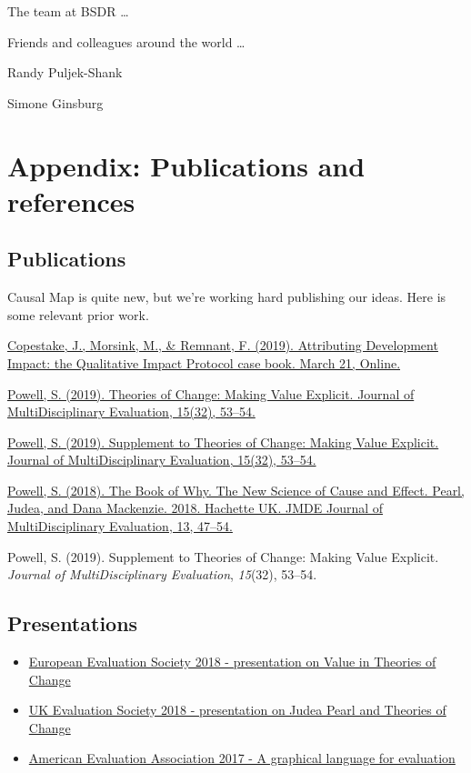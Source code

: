 \documentclass[
]{book}
\providecommand{\tightlist}{%
  \setlength{\itemsep}{0pt}\setlength{\parskip}{0pt}}
\begin{document}
The team at BSDR \ldots{}

Friends and colleagues around the world \ldots{}

Randy Puljek-Shank

Simone Ginsburg

\hypertarget{appendix-publications-and-references}{%
\chapter{Appendix: Publications and references}\label{appendix-publications-and-references}}

\hypertarget{publications}{%
\section{Publications}\label{publications}}

Causal Map is quite new, but we're working hard publishing our ideas. Here is some relevant prior work.

\href{https://practicalactionpublishing.com/book/105/attributing-development-impact}{Copestake, J., Morsink, M., \& Remnant, F. (2019). Attributing Development Impact: the Qualitative Impact Protocol case book. March 21, Online.}

\href{https://journals.sfu.ca/jmde/index.php/jmde_1/article/view/563}{Powell, S. (2019). Theories of Change: Making Value Explicit. Journal of MultiDisciplinary Evaluation, 15(32), 53--54.}

\href{https://journals.sfu.ca/jmde/index.php/jmde_1/article/view/561}{Powell, S. (2019). Supplement to Theories of Change: Making Value Explicit. Journal of MultiDisciplinary Evaluation, 15(32), 53--54.}

\href{https://journals.sfu.ca/jmde/index.php/jmde_1/article/view/507}{Powell, S. (2018). The Book of Why. The New Science of Cause and Effect. Pearl, Judea, and Dana Mackenzie. 2018. Hachette UK. JMDE Journal of MultiDisciplinary Evaluation, 13, 47--54.}

Powell, S. (2019). Supplement to Theories of Change: Making Value Explicit. \emph{Journal of MultiDisciplinary Evaluation}, \emph{15}(32), 53--54.

\hypertarget{presentations}{%
\section{Presentations}\label{presentations}}

\begin{itemize}
\tightlist
\item
  \href{https://drive.google.com/file/d/1FdiOs85iZCqZU6MdU3Lb5kgDOxq36G3b/view?usp=sharing}{European Evaluation Society 2018 - presentation on Value in Theories of Change}
\item
  \href{https://drive.google.com/file/d/1A2gIYmechpCot2QQc0TRWGlFg9r4jsz4/view?usp=sharing}{UK Evaluation Society 2018 - presentation on Judea Pearl and Theories of Change}
\item
  \href{http://comm.eval.org/viewdocument/theorymaker-a-graphical-language}{American Evaluation Association 2017 - A graphical language for evaluation}
\end{itemize}
\end{document}

